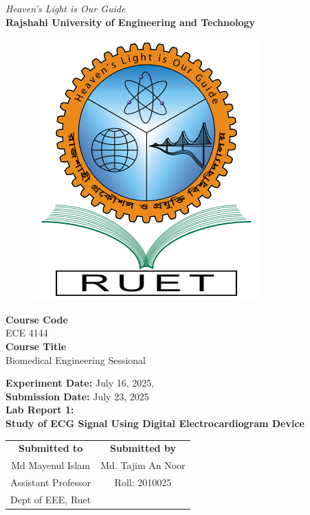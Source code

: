 \vspace*{\fill}
\begin{center}

    \emph{Heaven's Light is Our Guide} \\
    \textbf{Rajshahi University of Engineering and Technology} \\

    \begin{figure}[H]
        \centering
        \includegraphics[scale=.34]{images/RUET_logo.png}
        \label{fig:ruet_logo}
    \end{figure}
    \vspace{5mm}

    \textbf{Course Code}\\
    ECE 4144\\
    \vspace{3mm}
    \textbf{Course Title}\\
    Biomedical Engineering Sessional

    \vspace{5mm}
    \textbf{Experiment Date:} {July 16, 2025},\\
    \textbf{Submission Date:} {July 23, 2025}\\

    \vspace{5mm}
    \textbf{Lab Report 1: \\
        Study of ECG Signal Using Digital Electrocardiogram Device}

    \vspace{15mm}

    \begin{tabular}{c|c}
        \textbf{Submitted to} & \textbf{Submitted by} \\
        Md Mayenul Islam      & Md. Tajim An Noor     \\
        Assistant Professor   & Roll: 2010025         \\
        Dept of EEE, Ruet     &                       \\
    \end{tabular}

\end{center}
\vspace*{\fill}

